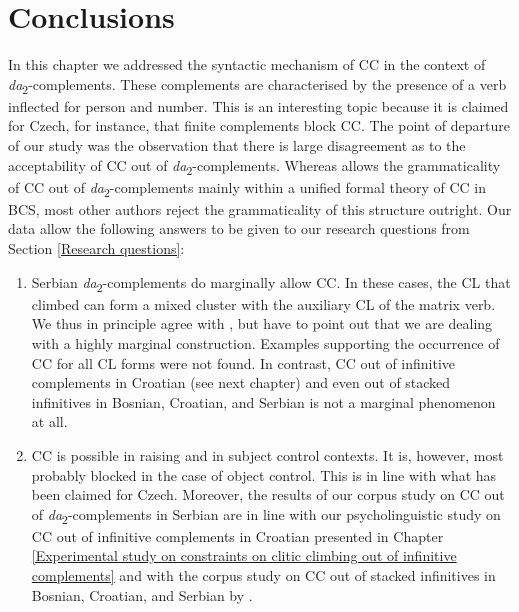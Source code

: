 \section{Conclusions}
\label{Conclusions:da}
In this chapter we addressed the syntactic mechanism of CC in the context of \textit{da}\textsubscript{2}-complements. These complements are characterised by the presence of a verb inflected for person and number. This is an interesting topic because it is claimed for Czech, for instance, that finite complements block CC. The point of departure of our study was the observation that there is large disagreement as to the acceptability of CC out of \textit{da}\textsubscript{2}-complements. Whereas \citet{Stjepanovic04} allows the grammaticality of CC out of \textit{da}\textsubscript{2}-complements mainly within a unified formal theory of CC in BCS, most other authors reject the grammaticality of this structure outright. Our data allow the following answers to be given to our research questions from Section \ref{Research questions}:

\begin{enumerate}[label=A\arabic*:]
\item Serbian \textit{da}\textsubscript{2}-complements do marginally allow CC. In these cases, the CL that climbed can form a mixed cluster with the auxiliary CL of the matrix verb. We thus in principle agree with  \citet{Stjepanovic04}, but have to point out that we are dealing with a highly marginal construction. Examples supporting the occurrence of CC for all CL forms were not found. In contrast, CC out of infinitive complements in Croatian (see next chapter) and even out of stacked infinitives in Bosnian, Croatian, and Serbian \citep*{HKJ18} is not a marginal phenomenon at all.

\item CC is possible in raising and in subject control contexts. It is, however, most probably blocked in the case of object control. This is in line with what has been claimed for Czech. Moreover, the results of our corpus study on CC out of \textit{da}\textsubscript{2}-complements in Serbian are in line with our psycholinguistic study on CC out of infinitive complements in Croatian presented in Chapter \ref{Experimental study on constraints on clitic climbing out of infinitive complements} and with the corpus study on CC out of stacked infinitives in Bosnian, Croatian, and Serbian by \citet*{HKJ18}.
\end{enumerate}

